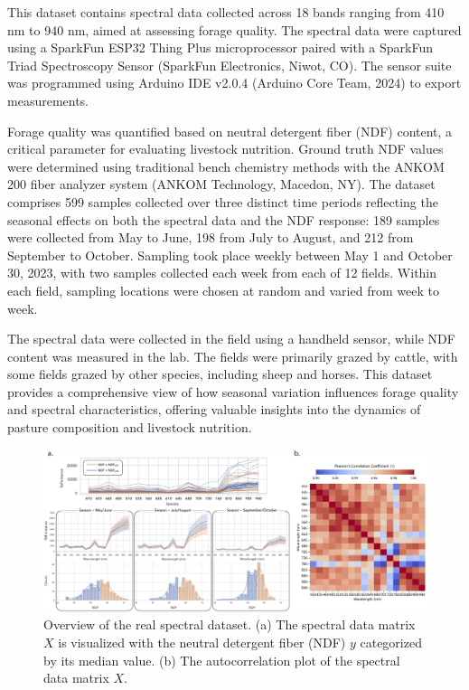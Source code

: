 This dataset contains spectral data collected across 18 bands ranging from 410 nm to 940 nm, aimed at assessing forage quality. The spectral data were captured using a SparkFun ESP32 Thing Plus microprocessor paired with a SparkFun Triad Spectroscopy Sensor (SparkFun Electronics, Niwot, CO). The sensor suite was programmed using Arduino IDE v2.0.4 (Arduino Core Team, 2024) to export measurements.

Forage quality was quantified based on neutral detergent fiber (NDF) content, a critical parameter for evaluating livestock nutrition. Ground truth NDF values were determined using traditional bench chemistry methods with the ANKOM 200 fiber analyzer system (ANKOM Technology, Macedon, NY). The dataset comprises 599 samples collected over three distinct time periods reflecting the seasonal effects on both the spectral data and the NDF response: 189 samples were collected from May to June, 198 from July to August, and 212 from September to October. Sampling took place weekly between May 1 and October 30, 2023, with two samples collected each week from each of 12 fields. Within each field, sampling locations were chosen at random and varied from week to week.

The spectral data were collected in the field using a handheld sensor, while NDF content was measured in the lab. The fields were primarily grazed by cattle, with some fields grazed by other species, including sheep and horses. This dataset provides a comprehensive view of how seasonal variation influences forage quality and spectral characteristics, offering valuable insights into the dynamics of pasture composition and livestock nutrition.

\begin{figure}[H]
    \centering
    \includegraphics[width=1\textwidth]{fig_3.jpg}
    \caption{Overview of the real spectral dataset. (a) The spectral data matrix $X$ is visualized with the neutral detergent fiber (NDF) $y$ categorized by its median value. (b) The autocorrelation plot of the spectral data matrix $X$.}
    \label{fig:3_real_data}
\end{figure}


